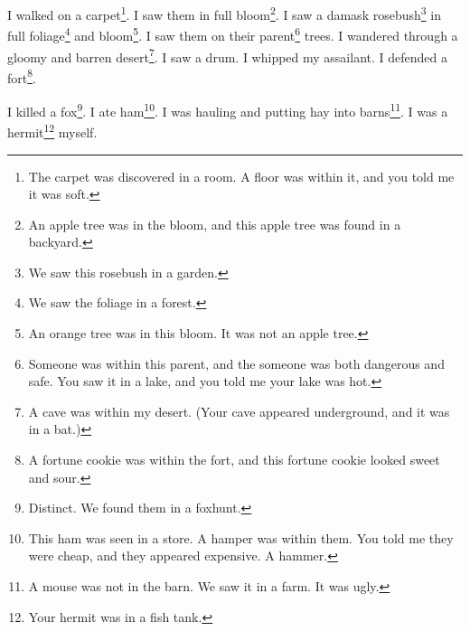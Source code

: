 \documentclass[12pt]{book}
\begin{document}
 I walked on a carpet\footnote{The carpet was discovered in a room. A floor was within it, and you told me it was soft.}. I saw them in full bloom\footnote{An apple tree was in the bloom, and this apple tree was found in a backyard.}. I saw a damask rosebush\footnote{We saw this rosebush in a garden.} in full foliage\footnote{We saw the foliage in a forest.} and bloom\footnote{An orange tree was in this bloom. It was not an apple tree.}. I saw them on their parent\footnote{Someone was within this parent, and the someone was both dangerous and safe. You saw it in a lake, and you told me your lake was hot.} trees. I wandered through a gloomy and barren desert\footnote{A cave was within my desert. (Your cave appeared underground, and it was in a bat.)}. I saw a drum. I whipped my assailant. I defended a fort\footnote{A fortune cookie was within the fort, and this fortune cookie looked sweet and sour.}. 

 I killed a fox\footnote{Distinct. We found them in a foxhunt.}. I ate ham\footnote{This ham was seen in a store. A hamper was within them. You told me they were cheap, and they appeared expensive. A hammer.}. I was hauling and putting hay into barns\footnote{A mouse was not in the barn. We saw it in a farm. It was ugly.}. I was a hermit\footnote{Your hermit was in a fish tank.} myself. 
\end{document}
